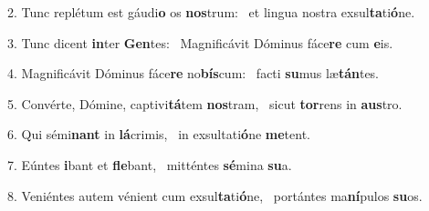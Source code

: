2. Tunc replétum est gáudi\textbf{o} os \textbf{nos}trum: \ast\  et lingua nostra exsul\textbf{ta}ti\textbf{ó}ne.\

3. Tunc dicent \textbf{in}ter \textbf{Gen}tes: \ast\  Magnificávit Dóminus fáce\textbf{re} cum \textbf{e}is.\

4. Magnificávit Dóminus fáce\textbf{re} no\textbf{bís}cum: \ast\  facti \textbf{su}mus læ\textbf{tán}tes.\

5. Convérte, Dómine, captivi\textbf{tá}tem \textbf{nos}tram, \ast\  sicut \textbf{tor}rens in \textbf{aus}tro.\

6. Qui sémi\textbf{nant} in \textbf{lá}crimis, \ast\  in exsultati\textbf{ó}ne \textbf{me}tent.\

7. Eúntes \textbf{i}bant et \textbf{fle}bant, \ast\  mitténtes \textbf{sé}mina \textbf{su}a.\

8. Veniéntes autem vénient cum exsul\textbf{ta}ti\textbf{ó}ne, \ast\  portántes ma\textbf{ní}pulos \textbf{su}os.\


